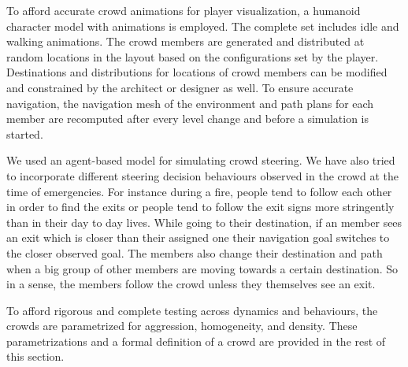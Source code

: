 To afford accurate crowd animations for player visualization, a humanoid character model with animations is employed. The complete set includes idle and walking animations. The crowd members are generated and distributed at random locations in the layout based on the configurations set by the player. Destinations and distributions for locations of crowd members can be modified and constrained by the architect or designer as well. To ensure accurate navigation, the navigation mesh of the environment and path plans for each member are recomputed after every level change and before a simulation is started.

We used an agent-based model for simulating crowd steering. We have also tried to incorporate different steering decision behaviours observed in the crowd at the time of emergencies. For instance during a fire, people tend to follow each other in order to find the exits or people tend to follow the exit signs more stringently than in their day to day lives. While going to their destination, if an member sees an exit which is closer than their assigned one their navigation goal switches to the closer observed goal. The members also change their destination and path when a big group of other members are moving towards a certain destination. So in a sense, the members follow the crowd unless they themselves see an exit.

To afford rigorous and complete testing across dynamics and behaviours, the crowds are parametrized for aggression, homogeneity, and density.  These parametrizations and a formal definition of a crowd are provided in the rest of this section.

